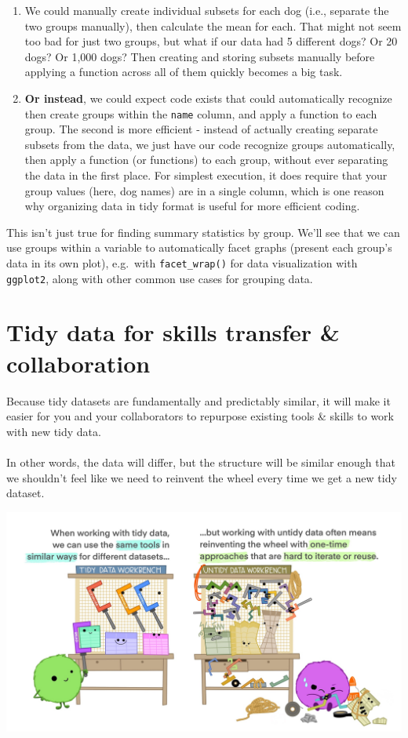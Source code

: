 \documentclass[
]{book}
\providecommand{\tightlist}{%
  \setlength{\itemsep}{0pt}\setlength{\parskip}{0pt}}
\begin{document}
\begin{enumerate}
\def\labelenumi{\arabic{enumi}.}
\tightlist
\item
  We could manually create individual subsets for each dog (i.e., separate the two groups manually), then calculate the mean for each. That might not seem too bad for just two groups, but what if our data had 5 different dogs? Or 20 dogs? Or 1,000 dogs? Then creating and storing subsets manually before applying a function across all of them quickly becomes a big task.
\item
  \textbf{Or instead}, we could expect code exists that could automatically recognize then create groups within the \texttt{name} column, and apply a function to each group. The second is more efficient - instead of actually creating separate subsets from the data, we just have our code recognize groups automatically, then apply a function (or functions) to each group, without ever separating the data in the first place. For simplest execution, it does require that your group values (here, dog names) are in a single column, which is one reason why organizing data in tidy format is useful for more efficient coding.
\end{enumerate}

This isn't just true for finding summary statistics by group. We'll see that we can use groups within a variable to automatically facet graphs (present each group's data in its own plot), e.g.~with \texttt{facet\_wrap()} for data visualization with \texttt{ggplot2}, along with other common use cases for grouping data.

\hypertarget{tidy-data-for-skills-transfer-collaboration}{%
\section{Tidy data for skills transfer \& collaboration}\label{tidy-data-for-skills-transfer-collaboration}}

Because tidy datasets are fundamentally and predictably similar, it will make it easier for you and your collaborators to repurpose existing tools \& skills to work with new tidy data.\\
~\\
In other words, the data will differ, but the structure will be similar enough that we shouldn't feel like we need to reinvent the wheel every time we get a new tidy dataset.

\includegraphics{images/tidydata_3.jpg}
\end{document}
